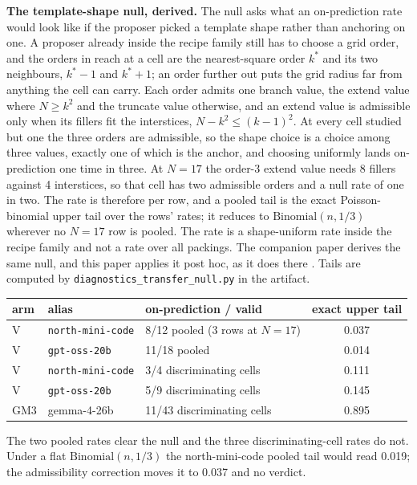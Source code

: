 \textbf{The template-shape null, derived.} The null asks what an on-prediction rate would look
like if the proposer picked a template shape rather than anchoring on one. A proposer already
inside the recipe family still has to choose a grid order, and the orders in reach at a cell
are the nearest-square order $k^*$ and its two neighbours, $k^*{-}1$ and $k^*{+}1$; an order
further out puts the grid radius far from anything the cell can carry. Each order admits one
branch value, the extend value where $N \ge k^2$ and the truncate value otherwise, and an
extend value is admissible only when its fillers fit the interstices, $N - k^2 \le (k-1)^2$.
At every cell studied but one the three orders are admissible, so the
shape choice is a choice among three values, exactly one of which is the
anchor, and choosing uniformly lands on-prediction one time in three. At $N = 17$ the order-3
extend value needs 8 fillers against 4 interstices, so that cell has two admissible orders and
a null rate of one in two. The rate is therefore per row, and a pooled tail is the exact
Poisson-binomial upper tail over the rows' rates; it reduces to $\mathrm{Binomial}(n, 1/3)$
wherever no $N = 17$ row is pooled. The rate is a
shape-uniform rate inside the recipe family and not a rate over all packings. The companion
paper derives the same null, and this paper applies it post hoc, as it does there
\citep{companion}. Tails are computed by
\texttt{diagnostics\bk\_transfer\bk\_null\bk.py} in the artifact.

\begin{center}
\begin{small}
\begin{tabular}{@{}lllc@{}}
\toprule
arm & alias & on-prediction / valid & exact upper tail \\
\midrule
V & \texttt{north-mini-code} & 8/12 pooled (3 rows at $N = 17$) & 0.037 \\
V & \texttt{gpt-oss-20b} & 11/18 pooled & 0.014 \\
V & \texttt{north-mini-code} & 3/4 discriminating cells & 0.111 \\
V & \texttt{gpt-oss-20b} & 5/9 discriminating cells & 0.145 \\
GM3 & gemma-4-26b & 11/43 discriminating cells & 0.895 \\
\bottomrule
\end{tabular}
\end{small}
\end{center}

The two pooled rates clear the null and the three discriminating-cell rates do not. Under a
flat $\mathrm{Binomial}(n, 1/3)$ the north-mini-code pooled tail would read 0.019; the
admissibility correction moves it to 0.037 and no verdict.

